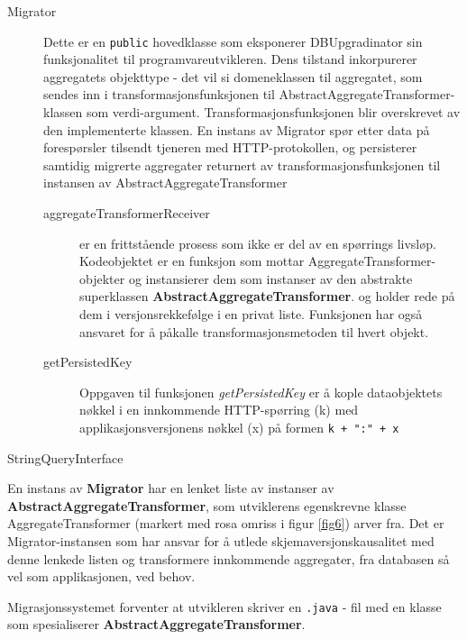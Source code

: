 \begin{description}

  \item [Migrator] Dette er en \texttt{public} hovedklasse som eksponerer DBUpgradinator sin funksjonalitet til programvareutvikleren. Dens tilstand inkorpurerer aggregatets objekttype - det vil si domeneklassen til aggregatet, som sendes inn i transformasjonsfunksjonen til AbstractAggregateTransformer-klassen som verdi-argument. Transformasjonsfunksjonen blir overskrevet av den implementerte klassen. En instans av Migrator spør etter data på forespørsler tilsendt tjeneren med HTTP-protokollen, og persisterer samtidig migrerte aggregater returnert av transformasjonsfunksjonen til instansen av AbstractAggregateTransformer
  \begin{description}
    \item [aggregateTransformerReceiver] er en frittstående prosess som ikke er del av en spørrings livsløp. Kodeobjektet er en funksjon som mottar AggregateTransformer-objekter og instansierer dem som instanser av den abstrakte superklassen \textbf{AbstractAggregateTransformer}. og holder rede på dem i versjonsrekkefølge i en privat liste. Funksjonen har også ansvaret for å påkalle transformasjonsmetoden til hvert objekt.
    \item [getPersistedKey] Oppgaven til funksjonen \emph{getPersistedKey} er å kople dataobjektets nøkkel i en innkommende HTTP-spørring (k) med applikasjonsversjonens nøkkel (x) på formen \texttt{k + ":" + x}
  \end{description}
  \item [StringQueryInterface]
\end{description}

En instans av \textbf{Migrator} har en lenket liste av instanser av \textbf{AbstractAggregateTransformer}, som utviklerens egenskrevne klasse AggregateTransformer (markert med rosa omriss i figur \ref{fig6}) arver fra. Det er Migrator-instansen som har ansvar for å utlede skjemaversjonskausalitet med denne lenkede listen og transformere innkommende aggregater, fra databasen så vel som applikasjonen, ved behov.

Migrasjonssystemet forventer at utvikleren skriver en \texttt{.java} - fil med en klasse som spesialiserer \textbf{AbstractAggregateTransformer}.


